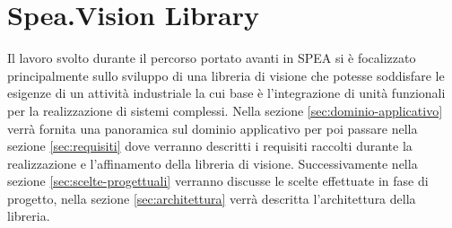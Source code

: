 \chapter{Spea.Vision Library}
Il lavoro svolto durante il percorso portato avanti in SPEA si è focalizzato
principalmente sullo sviluppo di una libreria di visione che potesse
soddisfare le esigenze di un attività industriale la cui base è l'integrazione
di unità funzionali per la realizzazione di sistemi complessi. Nella sezione \ref{sec:dominio-applicativo} verrà fornita una panoramica sul dominio applicativo per poi passare nella sezione \ref{sec:requisiti} dove verranno 
descritti i requisiti raccolti durante la realizzazione e l'affinamento della libreria di visione. Successivamente nella sezione \ref{sec:scelte-progettuali} verranno discusse le scelte effettuate in fase di progetto, nella sezione \ref{sec:architettura} verrà descritta l'architettura della libreria.













\endinput